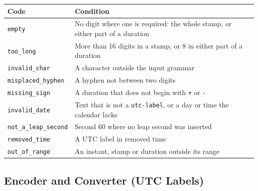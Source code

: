 \documentclass[11pt]{article}
\newcommand{\lit}[1]{\texttt{#1}}
\begin{document}
\begin{center}
\begin{tabularx}{\textwidth}{@{}lX@{}}
\toprule
Code & Condition \\
\midrule
\lit{empty} & No digit where one is required: the whole stamp, or either part of a duration \\
\lit{too\_long} & More than 16 digits in a stamp, or 8 in either part of a duration \\
\lit{invalid\_char} & A character outside the input grammar \\
\lit{misplaced\_hyphen} & A hyphen not between two digits \\
\lit{missing\_sign} & A duration that does not begin with \lit{+} or \lit{-} \\
\lit{invalid\_date} & Text that is not a \lit{utc-label}, or a day or time the calendar lacks \\
\lit{not\_a\_leap\_second} & Second 60 where no leap second was inserted \\
\lit{removed\_time} & A UTC label in removed time \\
\lit{out\_of\_range} & An instant, stamp or duration outside its range \\
\bottomrule
\end{tabularx}
\end{center}

\subsection{Encoder and Converter (UTC Labels)}
\end{document}
